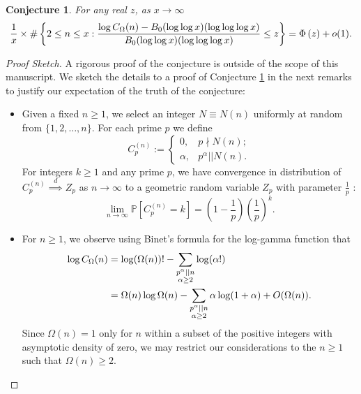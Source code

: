 \documentclass[11pt,reqno,a4letter]{article}
\newcommand{\hlocalref}[1]{\hyperref[#1]{\ref{#1}}}
\numberwithin{equation}{section}
\numberwithin{figure}{section}
\numberwithin{table}{section}
\let\citep\cite
\theoremstyle{plain}
\newtheorem{conjecture}[theorem]{Conjecture}
\numberwithin{theorem}{section}
\theoremstyle{definition}
\begin{document}
\begin{conjecture}
\label{conj_DetFormOfEKTypeThmForCOmegan_v1} 
For any real $z$, as $x \rightarrow \infty$ 
\begin{equation} 
\notag
\frac{1}{x} \times \#\left\{2 \leq n \leq x: 
	\frac{\log C_{\Omega}(n) - 
	B_0 (\log\log x) (\log\log\log x)}{B_0 (\log\log x)(\log\log\log x)} \leq z\right\} = 
     \Phi\left(z\right) + o(1). 
\end{equation}
\end{conjecture} 
\begin{proof}[Proof Sketch]
A rigorous proof of the conjecture is outside of the scope of this manuscript. 
We sketch the details to a proof of 
Conjecture \hlocalref{conj_DetFormOfEKTypeThmForCOmegan_v1} in the next remarks to 
justify our expectation of the truth of the conjecture: 
\begin{itemize}[noitemsep,topsep=0pt,leftmargin=0.23in]
\item
Given a fixed $n \geq 1$, we select an integer $N \equiv N(n)$ uniformly at random from 
$\{1,2,\ldots,n\}$. For each prime $p$ we define 
\[
C_p^{(n)} := \begin{cases} 0, & p \nmid N(n); \\ 
	\alpha, & p^{\alpha} || N(n). 
	\end{cases}
\]
For integers $k \geq 1$ and any prime $p$, we have convergence in distribution of 
$C_p^{(n)} \overset{d}{\implies} Z_p$ as $n \rightarrow \infty$ to 
a geometric random variable $Z_p$ with parameter $\frac{1}{p}$ 
\citep[\S 1.2]{LOG-COMB-STRUCTS-BOOK}: 
\[
\lim_{n \rightarrow \infty} \mathbb{P}\left[C_p^{(n)} = k\right] = 
     \left(1 - \frac{1}{p}\right)\left(\frac{1}{p}\right)^k. 
\]
\item 
For $n \geq 1$, we observe using Binet's formula for the log-gamma function 
\cite[\S 5.9(i)]{NISTHB} that 
\begin{align}
\notag
\log C_{\Omega}(n) & = \log (\Omega(n))! - 
	\sum_{\substack{p^{\alpha}||n \\ \alpha \geq 2}} \log(\alpha!) \\ 
\label{eqn_remark_LogCOmegan_IntermedExp_v1}
	& = \Omega(n) \log \Omega(n) - \sum_{\substack{p^{\alpha}||n \\ \alpha \geq 2}} 
	\alpha \log(1 + \alpha) + O(\Omega(n)). 
\end{align}
Since $\Omega(n) = 1$ only for $n$ within a subset of the positive 
integers with asymptotic density of zero, we may restrict our considerations 
to the $n \geq 1$ such that $\Omega(n) \geq 2$. 

\end{itemize}
\end{proof}
\end{document}
